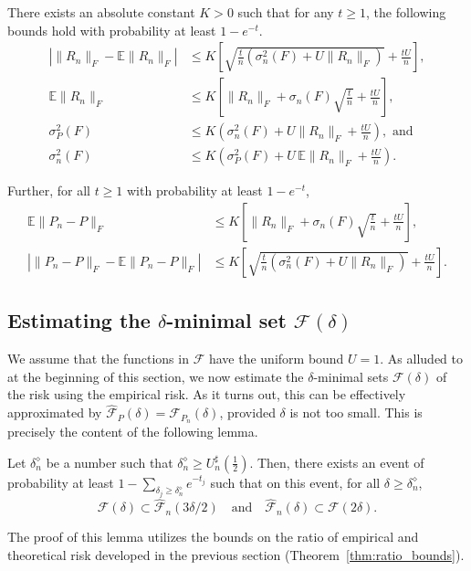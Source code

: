 \begin{theorem}\label{thm:new_talagrand}
  There exists an absolute constant $K>0$ such that for any $t \geq 1$, the following bounds hold with probability at least $1 - e^{-t}$.
  \begin{align*}
    \left| \|R_n\|_F - \mathbb{E}\|R_n\|_F \right| & \leq K \left[\sqrt{\frac{t}{n}\left(\sigma_n^2(F) + U\|R_n\|_F\right)}+ \frac{tU}{n}\right], \\
    \mathbb{E}\|R_n\|_F                            & \leq K \left[ \|R_n\|_F + \sigma_n(F)\sqrt{\frac{t}{n}} + \frac{tU}{n} \right],              \\
    \sigma_P^2(F)                                  & \leq K \left(\sigma_n^2(F)+ U\|R_n\|_F+ \frac{tU}{n}\right), \text{ and}                     \\
    \sigma_n^2(F)                                  & \leq K \left(\sigma_P^2(F)+ U\,\mathbb{E}\|R_n\|_F+ \frac{tU}{n}\right).
  \end{align*}

  Further, for all \(t \geq 1\) with probability at least \(1 - e^{-t}\),
  \begin{align*}
    \mathbb{E}\|P_n - P\|_F                             & \leq K \left[\|R_n\|_F+ \sigma_n(F)\sqrt{\frac{t}{n}}+ \frac{tU}{n}\right],                  \\
    \left|\|P_n - P\|_F -\mathbb{E}\|P_n - P\|_F\right| & \leq K \left[\sqrt{\frac{t}{n}\left(\sigma_n^2(F) + U\|R_n\|_F\right)}+ \frac{tU}{n}\right].
  \end{align*}
\end{theorem}

\subsection{Estimating the \texorpdfstring{$\delta$-minimal set $\mathcal{F}(\delta)$}{δ-minimal set F(δ)}}

We assume that the functions in $\mathcal{F}$ have the uniform bound $U = 1$. As alluded to at the beginning of this section, we now estimate the $\delta$-minimal sets $\mathcal{F}(\delta)$ of the risk using the empirical risk. As it turns out, this can be effectively approximated by $\hat{\mathcal{F}}_P(\delta) = \mathcal{F}_{P_n}(\delta)$, provided $\delta$ is not too small. This is precisely the content of the following lemma.

\begin{lemma}\label{lem:minimal_set}
  Let \(\delta_n^\diamond\) be a number such that
  \(\delta_n^\diamond \geq U_n^\sharp\!\left(\frac{1}{2}\right).\)
  Then, there exists an event of probability at least \( 1 - \sum_{\delta_j \geq \delta_n^\diamond} e^{-t_j}\) such that on this event, for all \(\delta \geq \delta_n^\diamond\),
  \[\mathcal{F}(\delta)\subset\hat{\mathcal{F}}_n(3\delta/2)\quad \text{and} \quad\hat{\mathcal{F}}_n(\delta)\subset\mathcal{F}(2\delta).
  \]
\end{lemma}
The proof of this lemma utilizes the bounds on the ratio of empirical and theoretical risk developed in the previous section (Theorem~\ref{thm:ratio_bounds}).

